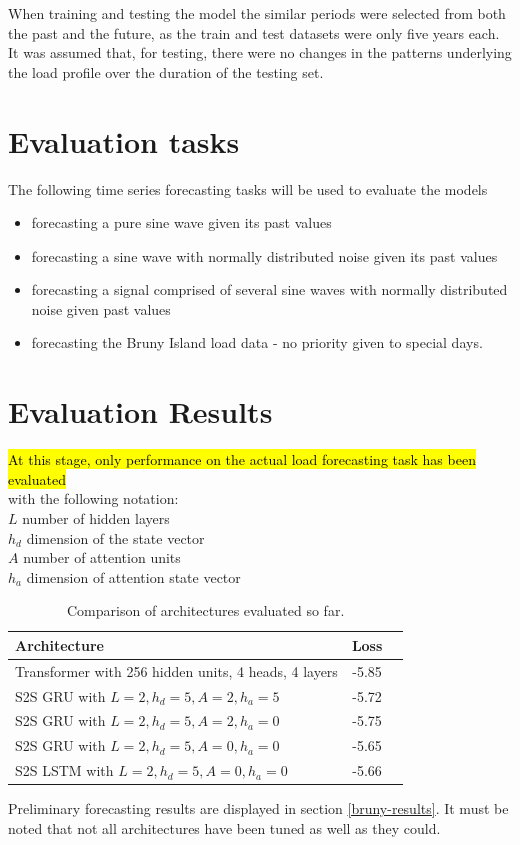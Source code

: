 When training and testing the model the similar periods were selected from both the past and the future, as the train and test datasets were only five years each.
It was assumed that, for testing, there were no changes in the patterns underlying the load profile over the duration of the testing set.

\section{Evaluation tasks}
The following time series forecasting tasks will be used to evaluate the models
\begin{itemize}
	\item forecasting a pure sine wave given its past values
	\item forecasting a sine wave with normally distributed noise given its past values
	\item forecasting a signal comprised of several sine waves with normally distributed noise given past values
	\item forecasting the Bruny Island load data - no priority given to special days.
\end{itemize}

\section{Evaluation Results}
\hl{At this stage, only performance on the actual load forecasting task has been evaluated} \\
with the following notation: \\
$L$ number of hidden layers \\
$h_d$ dimension of the state vector \\
$A$ number of attention units \\
$h_a$ dimension of attention state vector


\begin{table}[htbp]
	\centering
	\begin{tabular}{lcl}
		\hline
		\textbf{Architecture} & \textbf{Loss} & \\
		\hline
		Transformer with 256 hidden units, 4 heads, 4 layers   &  -5.85  &  \\
		S2S GRU with  $L = 2, h_d = 5, A=2, h_a=5$ &  -5.72  &  \\
		S2S GRU with  $L = 2, h_d = 5, A=2, h_a=0$  &  -5.75  &  \\
		S2S GRU with  $L = 2, h_d = 5, A=0, h_a=0$  &  -5.65  &  \\
		S2S LSTM with  $L = 2, h_d = 5, A=0, h_a=0$  &  -5.66  &  \\
		\hline
	\end{tabular}
	\caption{Comparison of architectures evaluated so far.}
	\label{tab:architecture_comparison}
\end{table}

Preliminary forecasting results are displayed in section \ref{bruny-results}.
It must be noted that not all architectures have been tuned as well as they could.



	